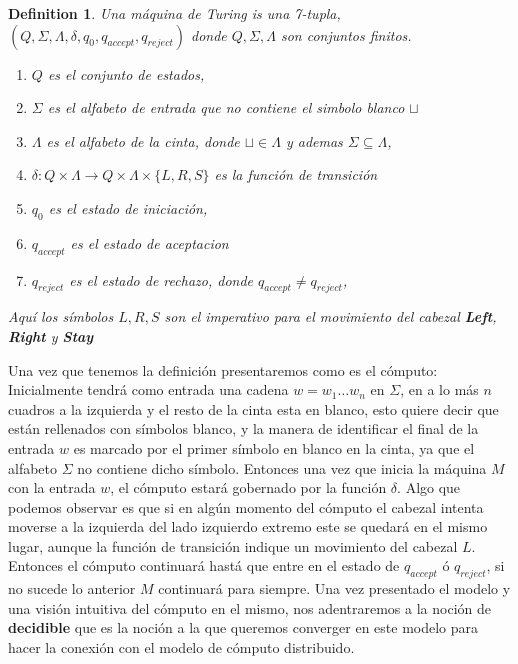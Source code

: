 \documentclass[10pt]{report}
\newtheorem{definition}{Definition}
\begin{document}
    \begin{definition}%
        Una máquina de Turing is una 7-tupla, $(Q,\Sigma,\Lambda,\delta,q_{0},q_{accept},q_{reject})$
        donde $Q,\Sigma,\Lambda$ son conjuntos finitos.
        \begin{enumerate}
            \item $Q$ es el conjunto de estados,
            \item $\Sigma$ es el alfabeto de entrada que no contiene el simbolo blanco $\sqcup$
            \item $\Lambda$ es el alfabeto de la cinta, donde  $\sqcup\in\Lambda$ y ademas $\Sigma\subseteq\Lambda$,
            \item $\delta: Q\times\Lambda \rightarrow Q\times\Lambda\times\{L,R,S\}$ es la función de transición
            \item $q_{0}$ es el estado de iniciación,
            \item $q_{accept}$ es el estado de aceptacion
            \item $q_{reject}$ es el estado de rechazo, donde $q_{accept} \neq q_{reject}$,

        \end{enumerate}
        Aquí los símbolos $L,R,S$ son el imperativo para el movimiento del cabezal \textbf{Left}, \textbf{Right} y \textbf{Stay}
    \end{definition}
    Una vez que tenemos la definición presentaremos como es el cómputo:\newline
    Inicialmente tendrá como entrada una cadena $w = w_{1}\dots w_{n}$ en $\Sigma$, en a lo más $n$ cuadros
    a la izquierda y el resto de la cinta esta en blanco, esto quiere decir que están rellenados con símbolos blanco,
    y la manera de identificar el final de la entrada $w$ es marcado por el primer símbolo en blanco en la cinta,
    ya que el alfabeto $\Sigma$ no contiene dicho símbolo.
    Entonces una vez que inicia la máquina $M$ con la entrada $w$, el cómputo estará gobernado por la función $\delta$.
    Algo que podemos observar es que si en algún momento del cómputo el cabezal intenta moverse a la izquierda del lado
    izquierdo extremo este se quedará en el mismo lugar, aunque la función de transición indique un movimiento del cabezal $L$.
    Entonces el cómputo continuará hastá que entre en el estado de $q_{accept}$ ó $q_{reject}$,
    si no sucede lo anterior $M$ continuará para siempre.
    \newline
    Una vez presentado el modelo y una visión intuitiva del cómputo en el mismo, nos adentraremos a la noción de
    \textbf{decidible} que es la noción a la que queremos converger en este modelo para hacer la conexión con el modelo
    de cómputo distribuido.
\end{document}
